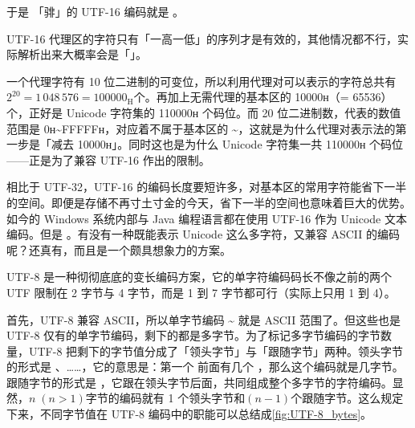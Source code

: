 于是 \relax{}「𬴂」的 UTF-16 编码就是 。

\begin{note}
  UTF-16 代理区的字符只有「一高一低」的序列才是有效的，其他情况都不行，实际解析出来大概率会是「\replacesymb」。
\end{note}

一个代理字符有 10 位二进制的可变位，所以利用代理对可以表示的字符总共有$2^{20} = 1\,048\,576 = 100000_{\mathrm{H}}$个。再加上无需代理的基本区的 10000ʜ（= 65536）个，正好是 Unicode 字符集的 110000ʜ 个码位。而 20 位二进制数，代表的数值范围是 0ʜ\textasciitilde{}FFFFFʜ，对应着不属于基本区的 \textasciitilde{}，这就是为什么代理对表示法的第一步是「减去 10000ʜ」。同时这也是为什么 Unicode 字符集一共 110000ʜ 个码位——正是为了兼容 UTF-16 作出的限制。

相比于 UTF-32，UTF-16 的编码长度要短许多，对基本区的常用字符能省下一半的空间。即便是存储不再寸土寸金的今天，省下一半的空间也意味着巨大的优势。如今的 Windows 系统内部与 Java 编程语言都在使用 UTF-16 作为 Unicode 文本编码。但是 。有没有一种既能表示 Unicode 这么多字符，又兼容 ASCII 的编码呢？还真有，而且是一个颇具想象力的方案。

UTF-8 是一种彻彻底底的变长编码方案，它的单字符编码码长不像之前的两个 UTF 限制在 2 字节与 4 字节，而是 1 到 7 字节都可行（实际上只用 1 到 4）。

首先，UTF-8 兼容 ASCII，所以单字节编码 \textasciitilde{} 就是 ASCII 范围了。但这些也是 UTF-8 仅有的单字节编码，剩下的都是多字节。为了标记多字节编码的字节数量，UTF-8 把剩下的字节值分成了「领头字节」与「跟随字节」两种。领头字节的形式是 、……，它的意思是：第一个  前面有几个 ，那么这个编码就是几字节。跟随字节的形式是 ，它跟在领头字节后面，共同组成整个多字节的字符编码。显然，$n\;(n>1)$字节的编码就有 1 个领头字节和$(n-1)$个跟随字节。这么规定下来，不同字节值在 UTF-8 编码中的职能可以总结成\autoref{fig:UTF-8_bytes}。


